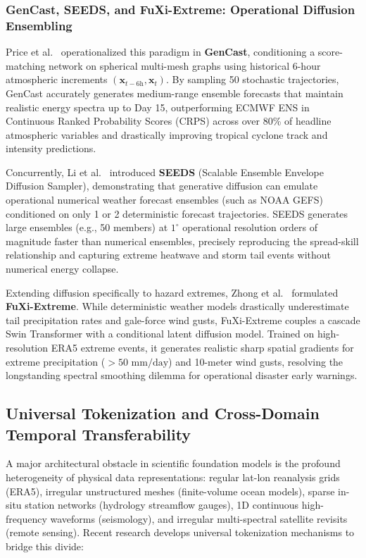 \subsubsection{GenCast, SEEDS, and FuXi-Extreme: Operational Diffusion Ensembling}
Price et al.~\cite{price2023gencast} operationalized this paradigm in \textbf{GenCast}, conditioning a score-matching network on spherical multi-mesh graphs using historical 6-hour atmospheric increments $(\mathbf{x}_{t-6\text{h}}, \mathbf{x}_t)$. By sampling 50 stochastic trajectories, GenCast accurately generates medium-range ensemble forecasts that maintain realistic energy spectra up to Day 15, outperforming ECMWF ENS in Continuous Ranked Probability Scores (CRPS) across over 80\% of headline atmospheric variables and drastically improving tropical cyclone track and intensity predictions.

Concurrently, Li et al.~\cite{li2024seeds} introduced \textbf{SEEDS} (Scalable Ensemble Envelope Diffusion Sampler), demonstrating that generative diffusion can emulate operational numerical weather forecast ensembles (such as NOAA GEFS) conditioned on only 1 or 2 deterministic forecast trajectories. SEEDS generates large ensembles (e.g., 50 members) at $1^\circ$ operational resolution orders of magnitude faster than numerical ensembles, precisely reproducing the spread-skill relationship and capturing extreme heatwave and storm tail events without numerical energy collapse.

Extending diffusion specifically to hazard extremes, Zhong et al.~\cite{chen2023fuxiextreme} formulated \textbf{FuXi-Extreme}. While deterministic weather models drastically underestimate tail precipitation rates and gale-force wind gusts, FuXi-Extreme couples a cascade Swin Transformer with a conditional latent diffusion model. Trained on high-resolution ERA5 extreme events, it generates realistic sharp spatial gradients for extreme precipitation ($>50\text{ mm/day}$) and 10-meter wind gusts, resolving the longstanding spectral smoothing dilemma for operational disaster early warnings.

\subsection{Universal Tokenization and Cross-Domain Temporal Transferability}
\label{sec:universal_tokenization}
A major architectural obstacle in scientific foundation models is the profound heterogeneity of physical data representations: regular lat-lon reanalysis grids (ERA5), irregular unstructured meshes (finite-volume ocean models), sparse in-situ station networks (hydrology streamflow gauges), 1D continuous high-frequency waveforms (seismology), and irregular multi-spectral satellite revisits (remote sensing). Recent research develops universal tokenization mechanisms to bridge this divide:

